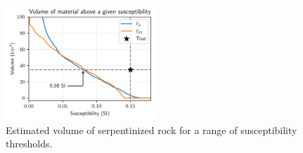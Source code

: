 \begin{figure}
    \begin{center}
    \includegraphics[width=0.5\textwidth]{figures/magnetics-l2-lpq-volume}
    \end{center}
\caption{
    Estimated volume of serpentinized rock for a range of susceptibility thresholds.
}
\label{fig:magnetics-l2-lpq-volume}
\end{figure}
